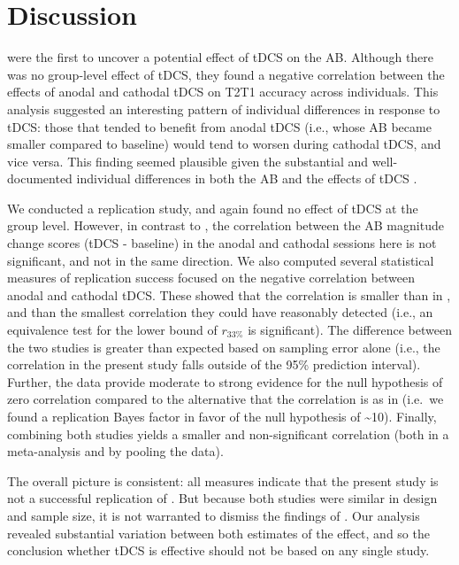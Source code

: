 \documentclass[11pt,]{memoir}
\begin{document}
\hypertarget{AB_tDCS-discussion}{%
\section{Discussion}\label{AB_tDCS-discussion}}

\textcite{London2015} were the first to uncover a potential effect of tDCS on the AB. Although there was no group-level effect of tDCS, they found a negative correlation between the effects of anodal and cathodal tDCS on T2\textbar{}T1 accuracy across individuals. This analysis suggested an interesting pattern of individual differences in response to tDCS: those that tended to benefit from anodal tDCS (i.e., whose AB became smaller compared to baseline) would tend to worsen during cathodal tDCS, and vice versa. This finding seemed plausible given the substantial and well-documented individual differences in both the AB \autocite{Willems2016} and the effects of tDCS \autocite{Krause2014}.

We conducted a replication study, and again found no effect of tDCS at the group level. However, in contrast to \textcite{London2015}, the correlation between the AB magnitude change scores (tDCS - baseline) in the anodal and cathodal sessions here is not significant, and not in the same direction. We also computed several statistical measures of replication success focused on the negative correlation between anodal and cathodal tDCS. These showed that the correlation is smaller than in \textcite{London2015}, and than the smallest correlation they could have reasonably detected (i.e., an equivalence test for the lower bound of \(r_{33\%}\) \autocite{Simonsohn2015} is significant). The difference between the two studies is greater than expected based on sampling error alone (i.e., the correlation in the present study falls outside of the 95\% prediction interval). Further, the data provide moderate to strong evidence for the null hypothesis of zero correlation compared to the alternative that the correlation is as in \textcite{London2015} (i.e.~we found a replication Bayes factor in favor of the null hypothesis of \textasciitilde{}10). Finally, combining both studies yields a smaller and non-significant correlation (both in a meta-analysis and by pooling the data).

The overall picture is consistent: all measures indicate that the present study is not a successful replication of \textcite{London2015}. But because both studies were similar in design and sample size, it is not warranted to dismiss the findings of \textcite{London2015}. Our analysis revealed substantial variation between both estimates of the effect, and so the conclusion whether tDCS is effective should not be based on any single study.
\end{document}
